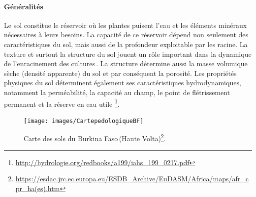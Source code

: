 \documentclass[a4paper,11pt]{article}
\begin{document}
\paragraph{Généralités}

Le sol constitue le réservoir où les plantes puisent l’eau et les
éléments minéraux nécessaires à leurs besoins. La capacité de ce
réservoir dépend non seulement des caractéristiques du sol, mais aussi
de la profondeur exploitable par les racine. La texture et surtout la
structure du sol jouent un rôle important dans la dynamique de
l’enracinement des cultures\,\cite{Chopart_1980}. La structure détermine
aussi la masse volumique sèche (densité apparente) du sol et par
conséquent la porosité. Les propriétés physiques du sol déterminent
également ses caractéristiques hydrodynamiques, notamment la
perméabilité, la capacité au champ, le point de flétrissement
permanent et la réserve en eau utile
\footnote{\url{http://hydrologie.org/redbooks/a199/iahs_199_0217.pdf}}.


\begin{figure}%
  \begin{center}
   \texttt{[image: images/CartepedologiqueBF]}
  \end{center}
  \caption{Carte des sols du Burkina Faso\,(Haute Volta)\protect\footnote{\protect\url{https://esdac.jrc.ec.europa.eu/ESDB_Archive/EuDASM/Africa/maps/afr_cpr_ha(es).htm}}.}
\end{figure}
\end{document}

